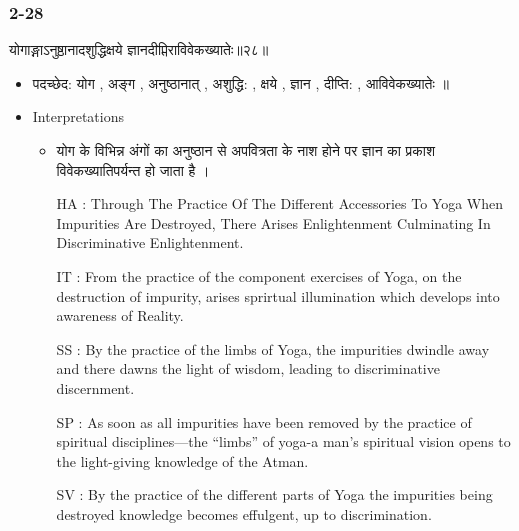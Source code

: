 \begin{frame}[fragile]\frametitle{2-28}
\begin{sanskrit}
योगाङ्गाऽनुष्ठानादशुद्धिक्षये ज्ञानदीप्तिराविवेकख्यातेः॥२८॥
\end{sanskrit}

	\begin{itemize}
	\item पदच्छेद: योग , अङ्ग , अनुष्ठानात् , अशुद्धि: , क्षये , ज्ञान , दीप्ति: , आविवेकख्यातेः ॥
	\item Interpretations
		\begin{itemize}
		\item योग के विभिन्न अंगों का अनुष्ठान से अपवित्रता के नाश होने पर ज्ञान का प्रकाश विवेकख्यातिपर्यन्त हो जाता है ।
		\item [HA]: Through The Practice Of The Different Accessories To Yoga When Impurities Are Destroyed, There Arises Enlightenment Culminating In Discriminative Enlightenment.
		\item [IT]: From the practice of the component exercises of Yoga, on the destruction of impurity, arises sprirtual illumination which develops into awareness of Reality.
		\item [SS]: By the practice of the limbs of Yoga, the impurities dwindle away and there dawns the light of wisdom, leading to discriminative discernment.
		\item [SP]: As soon as all impurities have been removed by the practice of spiritual disciplines—the “limbs” of yoga-a man’s spiritual vision opens to the light-giving knowledge of the Atman.
		\item [SV]: By the practice of the different parts of Yoga the impurities being destroyed knowledge becomes effulgent, up to discrimination. 
		\end{itemize}
	\end{itemize}
	
\end{frame}

